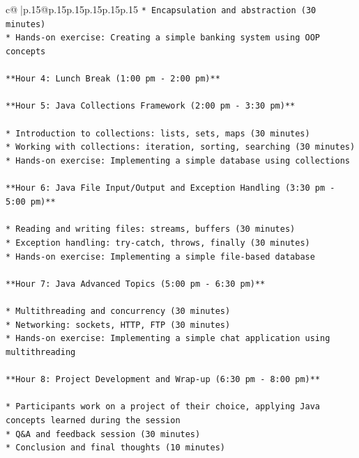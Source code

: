 \documentclass{article}
\begin{document}
{\begin{supertabular}{c@{$\;$}|p{.15\linewidth}@{}p{.15\linewidth}p{.15\linewidth}p{.15\linewidth}p{.15\linewidth}p{.15\linewidth}}
{{{\texttt{* Encapsulation and abstraction (30 minutes)} \\
\texttt{* Hands{-}on exercise: Creating a simple banking system using OOP concepts} \\
\\ 
\texttt{**Hour 4: Lunch Break (1:00 pm {-} 2:00 pm)**} \\
\\ 
\texttt{**Hour 5: Java Collections Framework (2:00 pm {-} 3:30 pm)**} \\
\\ 
\texttt{* Introduction to collections: lists, sets, maps (30 minutes)} \\
\texttt{* Working with collections: iteration, sorting, searching (30 minutes)} \\
\texttt{* Hands{-}on exercise: Implementing a simple database using collections} \\
\\ 
\texttt{**Hour 6: Java File Input/Output and Exception Handling (3:30 pm {-} 5:00 pm)**} \\
\\ 
\texttt{* Reading and writing files: streams, buffers (30 minutes)} \\
\texttt{* Exception handling: try{-}catch, throws, finally (30 minutes)} \\
\texttt{* Hands{-}on exercise: Implementing a simple file{-}based database} \\
\\ 
\texttt{**Hour 7: Java Advanced Topics (5:00 pm {-} 6:30 pm)**} \\
\\ 
\texttt{* Multithreading and concurrency (30 minutes)} \\
\texttt{* Networking: sockets, HTTP, FTP (30 minutes)} \\
\texttt{* Hands{-}on exercise: Implementing a simple chat application using multithreading} \\
\\ 
\texttt{**Hour 8: Project Development and Wrap{-}up (6:30 pm {-} 8:00 pm)**} \\
\\ 
\texttt{* Participants work on a project of their choice, applying Java concepts learned during the session} \\
\texttt{* Q\&A and feedback session (30 minutes)} \\
\texttt{* Conclusion and final thoughts (10 minutes)} \\
\\ 
}}}
\end{supertabular}}
\end{document}
